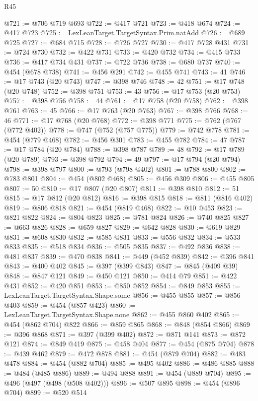 \begin{lexlean}{R45}
\begin{coremodule}
{{{{{{{{{{{{{{{{{{{{{{{{{{{{{{{{{{{{{{{{{{{{{{{{{{{{{{{{{{{{{{{{{{{{{{{{{{{{{{{{{{{{{{{{{{{@721 := @706 @719 @693
@722 := @417 @721
@723 := @418 @674
@724 := @417 @723
@725 := LexLeanTarget.TargetSyntax.Prim.natAdd
@726 := @689 @725
@727 := @684 @715
@728 := @726 @727
@730 := @417 @728 @431
@731 := @724 @730
@732 := @422 @731
@733 := @420 @732
@734 := @415 @733
@736 := @417 @734 @431
@737 := @722 @736
@738 := @680 @737
@740 := @454 (@678 @738)
@741 := @456 @291
@742 := @455 @741
@743 := 41
@746 := @17 @743 (@20 @743)
@747 := @398 @746
@748 := 42
@751 := @17 @748 (@20 @748)
@752 := @398 @751
@753 := 43
@756 := @17 @753 (@20 @753)
@757 := @398 @756
@758 := 44
@761 := @17 @758 (@20 @758)
@762 := @398 @761
@763 := 45
@766 := @17 @763 (@20 @763)
@767 := @398 @766
@768 := 46
@771 := @17 @768 (@20 @768)
@772 := @398 @771
@775 := @762 (@767 (@772 @402))
@778 := @747 (@752 (@757 @775))
@779 := @742 @778
@781 := @454 (@779 @468)
@782 := @456 @301
@783 := @455 @782
@784 := 47
@787 := @17 @784 (@20 @784)
@788 := @398 @787
@789 := 48
@792 := @17 @789 (@20 @789)
@793 := @398 @792
@794 := 49
@797 := @17 @794 (@20 @794)
@798 := @398 @797
@800 := @793 (@798 @402)
@801 := @788 @800
@802 := @783 @801
@804 := @454 (@802 @468)
@805 := @456 @309
@806 := @455 @805
@807 := 50
@810 := @17 @807 (@20 @807)
@811 := @398 @810
@812 := 51
@815 := @17 @812 (@20 @812)
@816 := @398 @815
@818 := @811 (@816 @402)
@819 := @806 @818
@821 := @454 (@819 @468)
@822 := @10 @453
@823 := @821 @822
@824 := @804 @823
@825 := @781 @824
@826 := @740 @825
@827 := @663 @826
@828 := @659 @827
@829 := @642 @828
@830 := @619 @829
@831 := @608 @830
@832 := @585 @831
@833 := @556 @832
@834 := @533 @833
@835 := @518 @834
@836 := @505 @835
@837 := @492 @836
@838 := @481 @837
@839 := @470 @838
@841 := @449 (@452 @839)
@842 := @396 @841
@843 := @400 @402
@845 := @397 (@399 @843)
@847 := @845 (@409 @39)
@848 := @847 @121
@849 := @450 @121
@850 := @414 @79
@851 := @422 @431
@852 := @420 @851
@853 := @850 @852
@854 := @849 @853
@855 := LexLeanTarget.TargetSyntax.Shape.some
@856 := @455 @855
@857 := @856 @403
@859 := @454 (@857 @423)
@860 := LexLeanTarget.TargetSyntax.Shape.none
@862 := @455 @860 @402
@865 := @454 (@862 @704) @822
@866 := @859 @865
@868 := @848 (@854 @866)
@869 := @396 @868
@871 := @397 (@399 @402)
@872 := @871 @141
@873 := @872 @121
@874 := @849 @419
@875 := @458 @404
@877 := @454 (@875 @704)
@878 := @439 @462
@879 := @472 @878
@881 := @454 (@879 @704)
@882 := @483 @478
@884 := @454 (@882 @704)
@885 := @495 @402
@886 := @486 @885
@888 := @484 (@485 @886)
@889 := @494 @888
@891 := @454 (@889 @704)
@895 := @496 (@497 (@498 (@508 @402)))
@896 := @507 @895
@898 := @454 (@896 @704)
@899 := @520 @514
}}}}}}}}}}}}}}}}}}}}}}}}}}}}}}}}}}}}}}}}}}}}}}}}}}}}}}}}}}}}}}}}}}}}}}}}}}}}}}}}}}}}}}}}}}}
\end{coremodule}
\end{lexlean}
